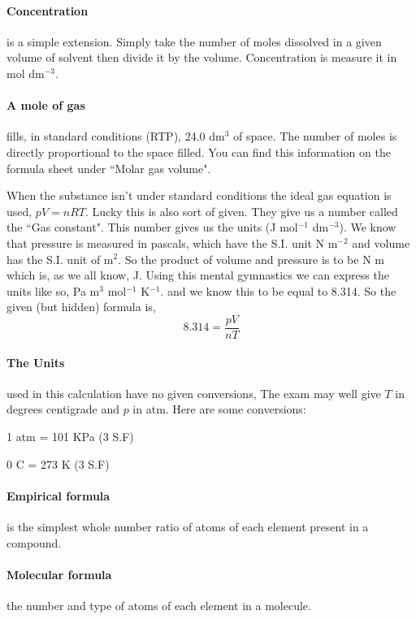 	\paragraph{Concentration} is a simple extension.
	Simply take the number of moles dissolved in a given volume of solvent then divide it by the volume.
	Concentration is measure it in mol dm$^{-3}$.
     
	\paragraph{A mole of gas} fills, in standard conditions (RTP), 24.0 dm$^3$ of space.
	The number of moles is directly proportional to the space filled.
	You can find this information on the formula sheet under ``Molar gas volume".
     
	When the substance isn't under standard conditions the ideal gas equation is used, $pV = nRT$. Lucky this is also sort of given.
	They give us a number called the ``Gas constant". This number gives us the units (J mol$^{-1}$ dm$^{-3}$).
	We know that pressure is measured in pascals, which have the S.I. unit N m$^{-2}$ and volume has the S.I. unit of m$^2$.
	So the product of volume and pressure is to be N m which is, as we all know, J.
	Using this mental gymnastics we can express the units like so, Pa m$^3$ mol$^{-1}$ K$^{-1}$. and we know this to be equal to 8.314.
	So the given (but hidden) formula is,
	\begin{equation}
		8.314 = \frac{pV}{nT}
	\end{equation}
	
	\paragraph{The Units} used in this calculation have no given conversions, The exam may well give $T$ in degrees centigrade and $p$ in atm. Here are some conversions:
    
	1 atm = 101 KPa (3 S.F)
	
	0  C = 273 K (3 S.F)
	
	\paragraph{Empirical formula} is the simplest whole number ratio of atoms of each element present in a compound.
	
	\paragraph{Molecular formula} the number and type of atoms of each element in a molecule.
    

